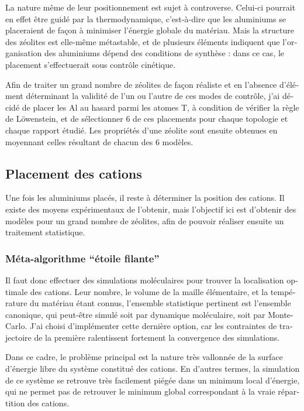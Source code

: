 \documentclass[thesis]{subfiles}
\begin{document}
\begin{otherlanguage}{french}
La nature même de leur positionnement est sujet à controverse. Celui-ci pourrait en effet être guidé par la thermodynamique, c'est-à-dire que les aluminiums se placeraient de façon à minimiser l'énergie globale du matériau. Mais la structure des zéolites est elle-même métastable, et de plusieurs éléments indiquent que l'organisation des aluminiums dépend des conditions de synthèse : dans ce cas, le placement s'effectuerait sous contrôle cinétique.

Afin de traiter un grand nombre de zéolites de façon réaliste et en l'absence d'élément déterminant la validité de l'un ou l'autre de ces modes de contrôle, j'ai décidé de placer les Al au hasard parmi les atomes T, à condition de vérifier la règle de L\"owenstein, et de sélectionner 6 de ces placements pour chaque topologie et chaque rapport \SiAl étudié. Les propriétés d'une zéolite sont ensuite obtenues en moyennant celles résultant de chacun des 6 modèles.

\subsection{Placement des cations}

Une fois les aluminiums placés, il reste à déterminer la position des cations. Il existe des moyens expérimentaux de l'obtenir, mais l'objectif ici est d'obtenir des modèles pour un grand nombre de zéolites, afin de pouvoir réaliser ensuite un traitement statistique.

\subsubsection{Méta-algorithme ``étoile filante''}

Il faut donc effectuer des simulations moléculaires pour trouver la localisation optimale des cations. Leur nombre, le volume de la maille élémentaire, et la température du matériau étant connus, l'ensemble statistique pertinent est l'ensemble canonique, qui peut-être simulé soit par dynamique moléculaire, soit par Monte-Carlo. J'ai choisi d'implémenter cette dernière option, car les contraintes de trajectoire de la première ralentissent fortement la convergence des simulations.

Dans ce cadre, le problème principal est la nature très vallonnée de la surface d'énergie libre du système constitué des cations. En d'autres termes, la simulation de ce système se retrouve très facilement piégée dans un minimum local d'énergie, qui ne permet pas de retrouver le minimum global correspondant à la vraie répartition des cations.


\end{otherlanguage}
\end{document}
